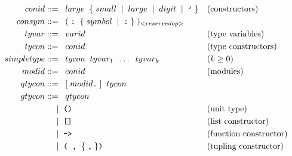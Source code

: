 \begin{align*}
	conid      & ::= \;\; large \;\; \{ \; small \;\; | \;\; large \;\; | \;\; digit \;\; | \;\; \texttt{'} \; \} &   & \text{(constructors)}         \\
	consym      &::= \;\; ( \; \texttt{:} \;\; \{ \; symbol \;\; | \;\; \texttt{:} \; \} \; )_{< reservedop >} \\
	tyvar      & ::= \;\; varid                                                           &   & \text{(type variables)}       \\
	tycon      & ::= \;\; conid                                                           &   & \text{(type constructors)}    \\
	simpletype & ::=\;\; tycon \;\; tyvar_1 \;\; \ldots \;\; tyvar_k                      &   & \text{($k \geq 0$)}           \\
	modid      & ::=\;\; conid                                                            &   & \text{(modules)}              \\
	qtycon  &::= \;\; [ \; modid \texttt{.} \; ] \;\; tycon \\
	gtycon  &::=\;\; qtycon \\
	           & \;\;\; \;\; | \;\; \texttt{()}                                                       &   & \text{(unit type)}            \\
	           & \;\;\; \;\; | \;\; \texttt{[]}                                                       &   & \text{(list constructor)}     \\
	           & \;\;\; \;\; | \;\; \texttt{->}                                                       &   & \text{(function constructor)} \\
	           & \;\;\; \;\; | \;\; \texttt{( ,}\;\; \{ \; \texttt{,} \; \}\texttt{)}                       &   & \text{(tupling constructor)}  \\
\end{align*}
